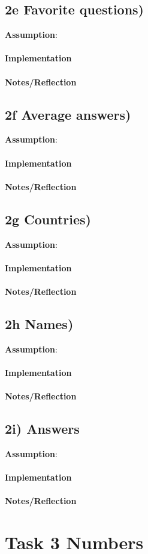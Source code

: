 \documentclass[fleqn,10pt]{wlscirep}
\begin{document}
\subsection*{2e Favorite questions) }
\textbf{Assumption}:  \\ \\
\textbf{Implementation}  \\ \\
\textbf{Notes/Reflection}

\subsection*{2f Average answers) }
\textbf{Assumption}:  \\ \\
\textbf{Implementation}  \\ \\
\textbf{Notes/Reflection}

\subsection*{2g Countries) }
\textbf{Assumption}:  \\ \\
\textbf{Implementation}  \\ \\
\textbf{Notes/Reflection}

\subsection*{2h Names) }
\textbf{Assumption}:  \\ \\
\textbf{Implementation}  \\ \\
\textbf{Notes/Reflection}

\subsection*{2i) Answers }
\textbf{Assumption}:  \\ \\
\textbf{Implementation}  \\ \\
\textbf{Notes/Reflection}

\section*{Task 3 Numbers}
\end{document}
